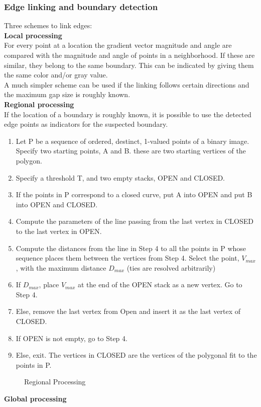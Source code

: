 \subsubsection{Edge linking and boundary detection}
Three schemes to link edges:\\
\textbf{Local processing}\\
For every point at a location the gradient vector magnitude and angle are compared with the magnitude and angle of points in a neighborhood. If these are similar, they belong to the same boundary. This can be indicated by giving them the same color and/or gray value.\\
A much simpler scheme can be used if the linking follows certain directions and the maximum gap size is roughly known.\\
\textbf{Regional processing}\\
If the location of a boundary is roughly known, it is possible to use the detected edge points as indicators for the suspected boundary.
\begin{enumerate}
\item Let P be a sequence of ordered, destinct, 1-valued points of a binary image. Specify two starting points, A and B. these are two starting vertices of the polygon.
\item Specify a threshold T, and two empty stacks, OPEN and CLOSED.
\item If the points in P correspond to a closed curve, put A into OPEN and put B into OPEN and CLOSED.
\item Compute the parameters of the line passing from the last vertex in CLOSED to the last vertex in OPEN.
\item Compute the distances from the line in Step 4 to all the points in P whose sequence places them between the vertices from Step 4. Select the point, $V_{max}$, with the maximum distance $D_{max}$ (ties are resolved arbitrarily)
\item If $D_{max}$, place $V_{max}$ at the end of the OPEN stack as a new vertex. Go to Step 4.
\item Else, remove the last vertex from Open and insert it as the last vertex of CLOSED.
\item If OPEN is not empty, go to Step 4.
\item Else, exit. The vertices in CLOSED are the vertices of the polygonal fit to the points in P.
\end{enumerate}
\begin{figure}[h]
	\centering
	\caption{Regional Processing}
\end{figure}
\textbf{Global processing}\\
